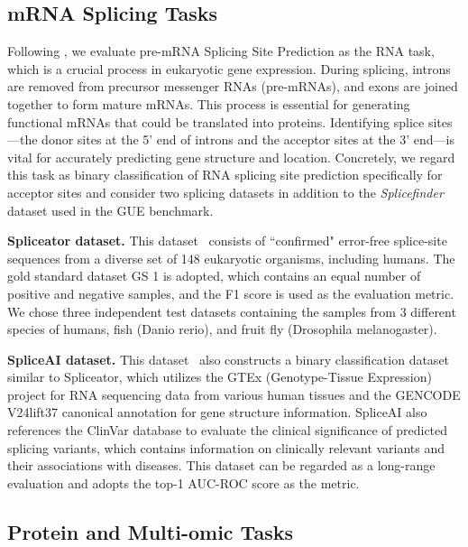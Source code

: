 \subsection{mRNA Splicing Tasks}
Following \citep{iclr2024dnabert2, shen2024rnafm}, we evaluate pre-mRNA Splicing Site Prediction as the RNA task, which is a crucial process in eukaryotic gene expression. During splicing, introns are removed from precursor messenger RNAs (pre-mRNAs), and exons are joined together to form mature mRNAs. This process is essential for generating functional
mRNAs that could be translated into proteins. Identifying splice sites—the donor sites at the 5' end of introns and the acceptor sites at the 3' end—is vital for accurately predicting gene structure and location.
Concretely, we regard this task as binary classification of RNA splicing site prediction specifically for acceptor sites and consider two splicing datasets in addition to the \textit{Splicefinder} dataset \citep{wang2019splicefinder} used in the GUE benchmark.

\textbf{Spliceator dataset.}\quad
This dataset~\citep{BMC2021spliceator} consists of ``confirmed" error-free splice-site sequences from a diverse set of 148 eukaryotic organisms, including humans. The gold standard dataset GS 1 is adopted, which contains an equal number of positive and negative samples, and the F1 score is used as the evaluation metric. We chose three independent test datasets containing the samples from 3 different species of humans, fish (Danio rerio), and fruit fly (Drosophila melanogaster).

\textbf{SpliceAI dataset.}\quad
This dataset~\citep{JAGANATHAN2019SpliceAI} also constructs a binary classification dataset similar to Spliceator, which utilizes the GTEx (Genotype-Tissue Expression) project for RNA sequencing data from various human tissues and the GENCODE V24lift37 canonical annotation for gene structure information. SpliceAI also references the ClinVar database to evaluate the clinical significance of predicted splicing variants, which contains information on clinically relevant variants and their associations with diseases. This dataset can be regarded as a long-range evaluation and adopts the top-1 AUC-ROC score as the metric.




\subsection{Protein and Multi-omic Tasks}
